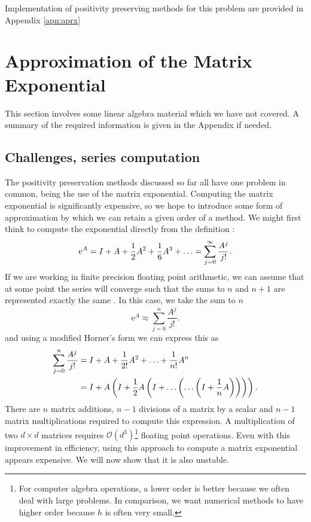 Implementation of positivity preserving methods for this problem are provided in Appendix \ref{apn:aprx}



\section{Approximation of the Matrix Exponential}
This section involves some linear algebra material which we have not covered.
A summary of the required information is given in the Appendix if needed.

\subsection{Challenges, series computation}

The positivity preservation methods discussed so far all have one problem in common, being the use of the matrix exponential.
Computing the matrix exponential is significantly expensive, so we hope to introduce some form of approximation by which we can retain a given order of a method.
We might first think to compute the exponential directly from the definition \cite{higham2008exponential}:
\begin{equation*}
    \mathrm{e}^A = I + A + \frac{1}{2}A^2 + \frac{1}{6}A^3 + \mathellipsis = \sum_{j=0}^{\infty} \frac{A^j}{j!}.
\end{equation*}
If we are working in finite precision floating point arithmetic, we can assume that at some point the series will converge such that the sums to $n$ and $n+1$ are represented exactly the same \cite{moler2003dubious}.
In this case, we take the sum to $n$
\begin{equation*}
    \mathrm{e}^A \approx \sum_{j = 0}^{n} \frac{A^j}{j!}.
\end{equation*}
and using a modified Horner's form \cite{knuth2014art} we can express this as
\begin{align*}
	\sum_{j = 0}^{n} \frac{A^j}{j!} &= I + A + \frac{1}{2!}A^2 + \mathellipsis + \frac{1}{n!} A^n \\
	&= I + A\left(
	I + \frac{1}{2} A\left(
			I + \mathellipsis\left(
				\mathellipsis \left( I + \frac{1}{n} A
				\right)
			\right)
		\right)
	\right).
\end{align*}
There are $n$ matrix additions, $n-1$ divisions of a matrix by a scalar and $n-1$ matrix multiplications required to compute this expression.
A multiplication of two $d \times d$ matrices requires $\mathcal{O}(d^3)$\footnote{
    For computer algebra operations, a lower order is better because we often deal with large problems.
    In comparison, we want numerical methods to have higher order because $h$ is often very small.
} floating point operations.
Even with this improvement in efficiency, using this approach to compute a matrix exponential appears expensive.
We will now show that it is also unstable.

